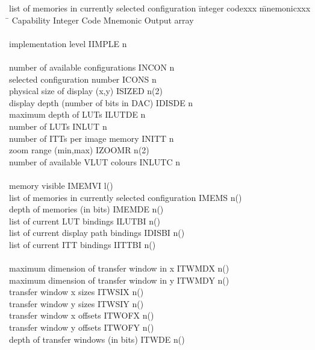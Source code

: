 \begin{tabbing}
list of memories in currently selected configuration \= integer codexxx \= mnemonicxxx \= \kill
Capability \> Integer Code \> Mnemonic \> Output array \\
\\
implementation level  \> IIMPLE \> n \\
\\
number of available configurations  \> INCON \> n \\
selected configuration number  \> ICONS \> n \\
physical size of display (x,y)  \> ISIZED \> n(2) \\
display depth (number of bits in DAC)  \> IDISDE \> n \\
maximum depth of LUTs  \> ILUTDE \> n \\
number of LUTs  \> INLUT \> n \\
number of ITTs per image memory  \> INITT \> n \\
zoom range (min,max)  \> IZOOMR \> n(2) \\
number of available VLUT colours  \> INLUTC \> n \\
\\
memory visible  \> IMEMVI \> l() \\
list of memories in currently selected configuration  \> IMEMS \> n() \\
depth of memories (in bits)  \> IMEMDE \> n() \\
list of current LUT bindings  \> ILUTBI \> n() \\
list of current display path bindings  \> IDISBI \> n() \\
list of current ITT bindings  \> IITTBI \> n() \\
\\
maximum dimension of transfer window in x  \> ITWMDX \> n() \\
maximum dimension of transfer window in y  \> ITWMDY \> n() \\
transfer window x sizes  \> ITWSIX \> n() \\
transfer window y sizes  \> ITWSIY \> n() \\
transfer window x offsets  \> ITWOFX \> n() \\
transfer window y offsets  \> ITWOFY \> n() \\
depth of transfer windows (in bits)  \> ITWDE \> n() \\

\end{tabbing}
